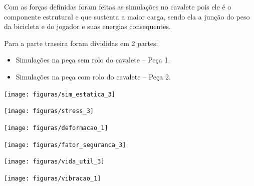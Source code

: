     Com as forças definidas foram feitas as simulações no cavalete pois ele é o componente estrutural e que sustenta a maior carga, sendo ela a junção do peso da bicicleta e do jogador e suas energias consequentes.

    Para a parte traseira foram divididas em 2 partes:
    \begin{itemize}
        \item Simulações na peça sem rolo do cavalete – Peça 1.
        \item Simulações na peça com rolo do cavalete – Peça 2.
    \end{itemize}

    \begin{center}
    	\texttt{[image: figuras/sim\_estatica\_3]}
        \label{sim_estatica_3}
    \end{center}

    \begin{center}
    	\texttt{[image: figuras/stress\_3]}
        \label{stress_3}
    \end{center}

    \begin{center}
    	\texttt{[image: figuras/deformacao\_1]}
        \label{deformacao_1}
    \end{center}

    \begin{center}
    	\texttt{[image: figuras/fator\_seguranca\_3]}
        \label{fator_seguranca_3}
    \end{center}

    \begin{center}
    	\texttt{[image: figuras/vida\_util\_3]}
        \label{vida_util_3}
    \end{center}

    \begin{center}
    	\texttt{[image: figuras/vibracao\_1]}
        \label{vibracao_1}
    \end{center}

